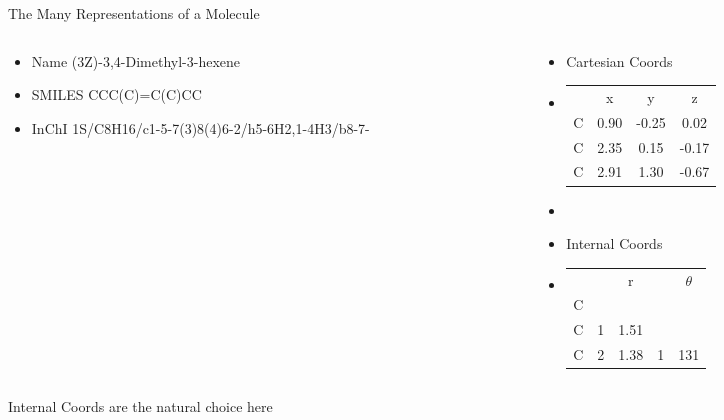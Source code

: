 \documentclass[10pt]{beamer}
\begin{document}
{\begin{frame}{The Many Representations of a Molecule}
\begin{columns}[c]
    \begin{column}{0.3\textwidth}
      \begin{itemize}
		   \item[] {\alert{Name} \mbox{(3Z)-3,4-Dimethyl}-3-hexene}
		   \item[] {\alert{SMILES} CCC(C)=C(C)CC}
		   \item[] {\alert{InChI} 1S/C8H16/c1-5-7(3)8(4)6-2/h5-6H2,1-4H3/b8-7-}
      \end{itemize}
    \end{column}
   
    \begin{column}{0.45\textwidth}
        \begin{itemize}
      \item[] {\alert{Cartesian Coords}}
      \item[] {
        \begin{tabular}{l c c c}
              &         x    &       y     &      z  \\
          C   &       0.90   &    -0.25    &    0.02 \\
          C   &       2.35   &     0.15    &   -0.17 \\
          C   &       2.91   &     1.30    &   -0.67 \\
        \end{tabular}
        }
          \item[]{}
          \item[] {\alert{Internal Coords}}
          \item[] {
            \begin{tabular}{l c c c c}
              &   &   r  &   &  $\theta$ \\
            C &   &      &   &           \\
            C & 1 & 1.51 &   &           \\
            C & 2 & 1.38 & 1 & 131       \\
            \end{tabular}
          }
          \end{itemize}
    \end{column}
   
  \end{columns}
\alert{Internal Coords} are the natural choice here
\end{frame}

}
\end{document}
